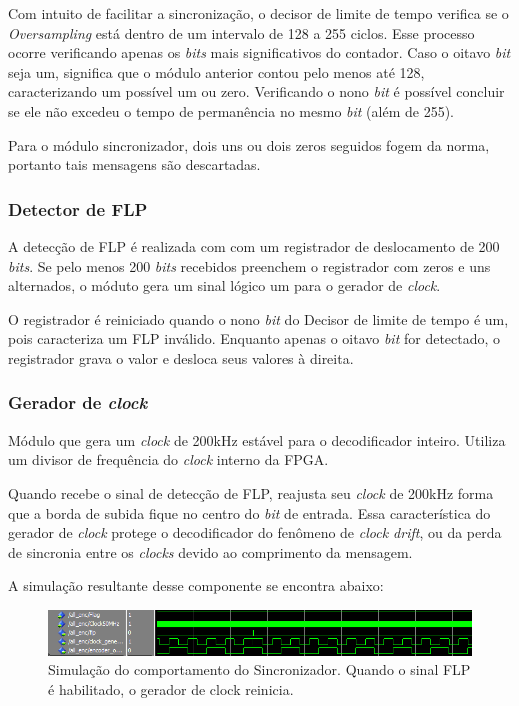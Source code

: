 	Com intuito de facilitar a sincronização, o decisor de limite de tempo verifica se o \textit{Oversampling} está dentro de um intervalo de 128 a 255 ciclos. Esse processo ocorre verificando apenas os \textit{bits} mais significativos do contador. Caso o oitavo \textit{bit} seja um, significa que o módulo anterior contou pelo menos até 128, caracterizando um possível um ou zero. Verificando o nono \textit{bit} é possível concluir se ele não excedeu o tempo de permanência no mesmo \textit{bit} (além de 255). 
	
	Para o módulo sincronizador, dois uns ou dois zeros seguidos fogem da norma, portanto tais mensagens são descartadas.
	
	\subsubsection{Detector de FLP}
	A detecção de FLP é realizada com com um registrador de deslocamento de 200 \textit{bits}. Se pelo menos 200 \textit{bits} recebidos preenchem o registrador com zeros e uns alternados, o móduto gera um sinal lógico um para o gerador de \textit{clock}.
	
	O registrador é reiniciado quando o nono \textit{bit} do Decisor de limite de tempo é um, pois caracteriza um FLP inválido. Enquanto apenas o oitavo \textit{bit} for detectado, o registrador grava o valor e desloca seus valores à direita.
	\subsubsection{Gerador de \textit{clock}}
	Módulo que gera um \textit{clock} de 200kHz estável para o decodificador inteiro. Utiliza um divisor de frequência do \textit{clock} interno da FPGA.
	
	Quando recebe o sinal de detecção de FLP, reajusta seu \textit{clock} de 200kHz forma que a borda de subida fique no centro do \textit{bit} de entrada. Essa característica do gerador de \textit{clock} protege o decodificador do fenômeno de \textit{clock drift}, ou da perda de sincronia entre os \textit{clocks} devido ao comprimento da mensagem.
	
	A simulação resultante desse componente se encontra abaixo:
	\begin{figure}[h]
		\caption{\label{figure:sync-simulation}Simulação do comportamento do Sincronizador. Quando o sinal FLP é habilitado, o gerador de clock reinicia.}
		\centering
		\includegraphics[width=1\textwidth]{sync/simulation.png}
	\end{figure}
	
